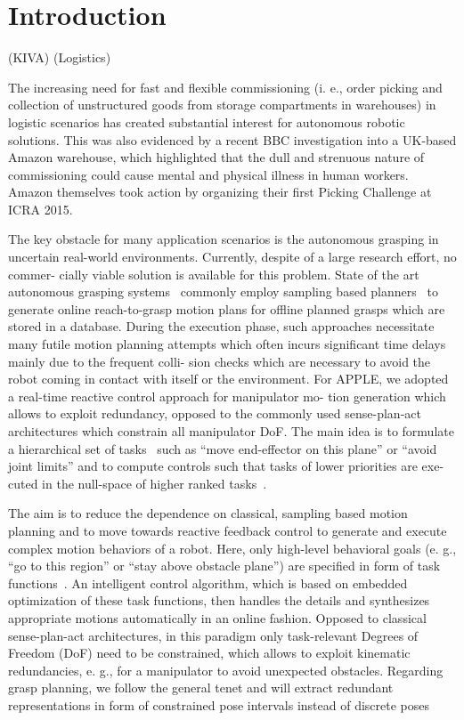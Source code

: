 \section{Introduction}
\label{sec:intro}
%
\cite{Wurm08}(KIVA) \cite{Eche08}(Logistics)

The increasing need for fast and flexible commissioning (i. e., order picking and collection of
unstructured goods from storage compartments in warehouses) in logistic scenarios has created
substantial interest for autonomous robotic solutions. This was also evidenced by a recent BBC
investigation into a UK-based Amazon warehouse, which highlighted that the dull and strenuous nature
of commissioning could cause mental and physical illness in human workers. Amazon themselves took
action by organizing their first Picking Challenge at ICRA 2015.

The key obstacle for many application scenarios is the autonomous grasping in uncertain real-world
environments. Currently, despite of a large research effort, no commer- cially viable solution is
available for this problem. State of the art autonomous grasping systems~\cite{Bere07, Srin10,
  Krug14a} commonly employ sampling based planners~\cite{LaVa06} to generate online reach-to-grasp
motion plans for offline planned grasps which are stored in a database.  During the execution phase,
such approaches necessitate many futile motion planning attempts which often incurs significant time
delays mainly due to the frequent colli- sion checks which are necessary to avoid the robot coming
in contact with itself or the environment.  For APPLE, we adopted a real-time reactive control
approach for manipulator mo- tion generation which allows to exploit redundancy, opposed to the
commonly used sense-plan-act architectures which constrain all manipulator DoF. The main idea is to
formulate a hierarchical set of tasks~\cite{Sams91} such as “move end-effector on this plane” or
“avoid joint limits” and to compute controls such that tasks of lower priorities are exe- cuted in
the null-space of higher ranked tasks~\cite{Sici91, Sent10}.

The aim is to reduce the dependence on classical, sampling based motion planning and to move towards
reactive feedback control to generate and execute complex motion behaviors of a robot.  Here, only
high-level behavioral goals (e. g., “go to this region” or “stay above obstacle plane”) are
specified in form of task functions~\cite{Sams91}. An intelligent control algorithm, which is based
on embedded optimization of these task functions, then handles the details and synthesizes
appropriate motions automatically in an online fashion. Opposed to classical sense-plan-act
architectures, in this paradigm only task-relevant Degrees of Freedom (DoF) need to be constrained,
which allows to exploit kinematic redundancies, e. g., for a manipulator to avoid unexpected
obstacles. Regarding grasp planning, we follow the general tenet and will extract redundant
representations in form of constrained pose intervals instead of discrete poses
